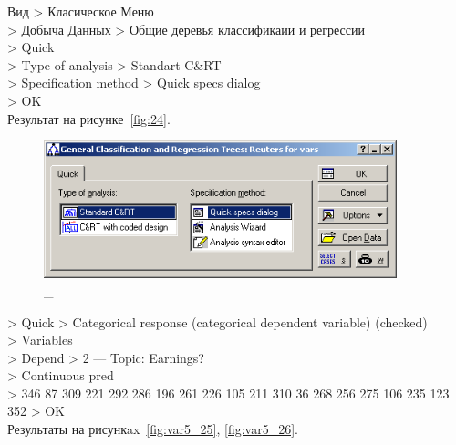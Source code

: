 Вид > Класическое Меню \\
> Добыча Данных > Общие деревья классификаии и регрессии \\
> Quick \\
> Type of analysis > Standart C\&RT \\
> Specification method > Quick specs dialog \\
> OK \\

Результат на рисунке~\ref{fig:24}.

\begin{figure}[!h]
  \centering

  \includegraphics[height=4cm]
  {inc/var5/24.PNG}

  \caption{\_}

  \label{fig:var5_24}
\end{figure}

\newpage

> Quick > Categorical response (categorical dependent variable) (checked) \\
> Variables \\
> Depend > 2 — Topic: Earnings? \\
> Continuous pred\\
> 346 87 309 221 292 286 196 261 226 105 211 310 36 268 256 275 106 235 123 352 > OK\\

Результаты на рисункax~\ref{fig:var5_25}, \ref{fig:var5_26}.

